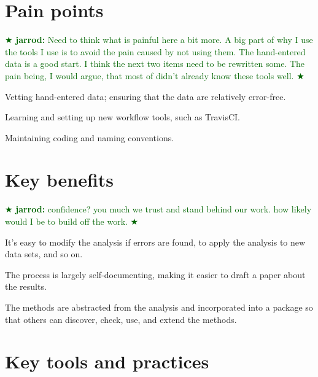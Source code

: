 \documentclass[]{article}
\newcommand{\jarrod}[1] { \textcolor{darkgreen} {
\ensuremath{\bigstar} {\bf jarrod:}  {#1}
\ensuremath{\bigstar} } }
\begin{document}
\section{Pain points}\label{pain-points}


\jarrod{Need to think what is painful here a bit more. A big part of 
why I use the tools I use is to avoid the pain caused by not using
them.  The hand-entered data is a good start.  I think the next
two items need to be rewritten some.  The pain being, I would argue,
that most of didn't already know these tools well.} 

Vetting hand-entered data; ensuring that the data are relatively
error-free.

Learning and setting up new workflow tools, such as TravisCI.

Maintaining coding and naming conventions.

\section{Key benefits}\label{key-benefits}


\jarrod{confidence?  you much we trust and stand behind our work.
how likely would I be to build off the work.}

It's easy to modify the analysis if errors are found, to apply the
analysis to new data sets, and so on.

The process is largely self-documenting, making it easier to draft a
paper about the results.

The methods are abstracted from the analysis and incorporated into a
package so that others can discover, check, use, and extend the
methods.

\section{Key tools and practices}\label{key-tools}
\end{document}
